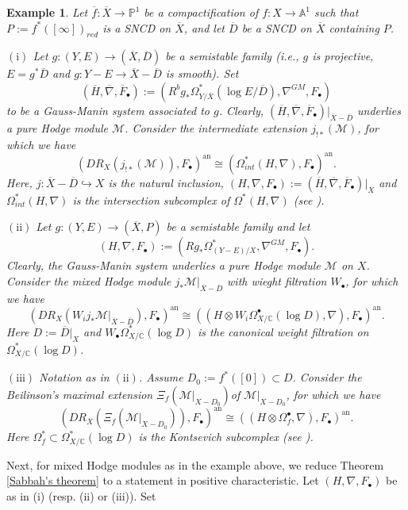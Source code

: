 \documentclass[12pt, a4paper]{article}
\newtheorem{example}{Example}[section]
\begin{document}
\begin{example}\label{MHM}
Let $\overline f:\overline X\to\mathbb P^1$ be a compactification of $f:X\to\mathbb A^1$ such that $P:=f^*([\infty])_{red}$ is a SNCD on $\overline X$, and let $\overline D$ be a SNCD on $\overline X$ containing $P$.

$\mathrm{(i)}$ Let $g:( Y, E)\to(\overline X,\overline D)$ be a semistable family (i.e., $g$ is projective, $ E=g^*\overline D$ and $g: Y- E\to \overline X-\overline D$ is smooth). Set
$$
(\overline H,\overline\nabla,\overline F_\bullet):=(R^bg_*\Omega^*_{ Y/\overline X}(\log  E/\overline D),\nabla^{GM},F_\bullet)
$$
to be a Gauss-Manin system associated to $g$. Clearly, $(\overline H,\overline\nabla,\overline F_\bullet)|_{\overline X-\overline D}$ underlies a pure Hodge module $\mathcal M$. Consider the intermediate extension $j_{!*}(\mathcal M)$, for which we have
$$
(DR_X(j_{!*}(\mathcal M)),F_\bullet)^\mathrm{an}\cong(\Omega_{int}^*(H,\nabla),F_\bullet)^\mathrm{an}. 
$$
Here, $j:\overline X-\overline D\hookrightarrow X$ is the natural inclusion, $(H,\nabla,F_\bullet):=(\overline H,\overline\nabla,\overline F_\bullet)|_X$ and $\Omega_{int}^*(H,\nabla)$ is the intersection subcomplex of $\Omega^*(H,\nabla)$ (see \cite[\S2]{SZ2}).

$\mathrm{(ii)}$ Let $g:(Y,E)\to(\overline X,P)$ be a semistable family and let
$$
(H,\nabla,F_\bullet):=(Rg_*\Omega^*_{(Y-E)/X},\nabla^{GM},F_\bullet).
$$
Clearly, the Gauss-Manin system underlies a pure Hodge module $\mathcal M$ on $X$. Consider the mixed Hodge module $j_*\mathcal M|_{\overline X-\overline D}$ with wieght filtration $W_\bullet$, for which we have
$$
(DR_X(W_ij_*\mathcal M|_{\overline X-\overline D}),F_\bullet)^\mathrm{an}\cong((H\otimes W_i\Omega^\bullet_{X/\mathbb C}(\log D),\nabla),F_\bullet)^\mathrm{an}.
$$
Here $D:=\overline D|_X$ and $W_\bullet\Omega^*_{X/\mathbb C}(\log D)$ is the canonical weight filtration on $\Omega^*_{X/\mathbb C}(\log D)$.

$\mathrm{(iii)}$  Notation as in $\mathrm{(ii)}$. Assume $D_0:=f^*([0])\subset D$. Consider the  Beilinson's maximal extension $\Xi_f(\mathcal M|_{X-D_0})$of $\mathcal M|_{X-D_0}$, for which we have
$$
(DR_X(\Xi_f(\mathcal M|_{X-D_0})),F_\bullet)^\mathrm{an}\cong((H\otimes\Omega^\bullet_f,\nabla),F_\bullet)^\mathrm{an}.
$$
Here $\Omega^*_f\subset\Omega_{X/\mathbb C}^*(\log D)$ is the Kontsevich subcomplex (see \cite[Appendix E]{ESY}).
\end{example}
Next, for mixed Hodge modules as in the example above, 
we reduce Theorem \ref{Sabbah's theorem} to a statement in positive characteristic. Let $(H,\nabla,F_\bullet)$ be as in (i) (resp. (ii) or (iii)). Set
\end{document}

